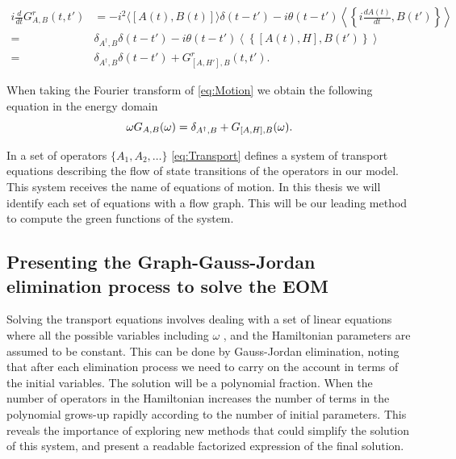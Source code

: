 \begin{align}
i\frac{d}{dt}G_{A,B}^{r}\left(t,t'\right)&=-i^{2}\langle\left[A(t),B(t)\right]\rangle\delta\left(t-t'\right)-i\theta\left(t-t'\right){\displaystyle \left\langle \left\{ i\frac{dA(t)}{dt},B(t')\right\} \right\rangle } \\
=& \delta_{A^{\dagger},B}\delta\left(t-t'\right)-i\theta\left(t-t'\right)\left\langle \left\{ \left[A(t),H\right],B(t')\right\} \right\rangle  \\
= & \delta_{A^{\dagger},B}\delta\left(t-t'\right)+G_{\left[A,H'\right],B}^{r}\left(t,t'\right). \label{eq:Motion}
\end{align}

When taking the Fourier transform of \eqref{eq:Motion} we obtain the following equation in the energy domain  
\begin{equation}
    \omega G_{A,B}(\omega)=\delta_{A^{\dagger},B}+G_{\left[A,H\right],B}(\omega).
    \label{eq:Transport}
\end{equation}


\noindent In a set of operators $\{A_1, A_2, \ldots \}$ \eqref{eq:Transport} defines a system of transport equations describing the flow of state transitions of the operators in our model. This system receives the  name of equations of motion. In this thesis we will identify each set of equations with a flow graph. This will be our leading method to compute the green functions of the system.


\subsection{Presenting the Graph-Gauss-Jordan elimination process to solve the EOM \label{sec:GraphMethod}}


Solving the transport equations involves dealing with a set of linear equations where all the possible variables including  $\omega$ , and the Hamiltonian parameters are assumed to be constant.  This can be done by  Gauss-Jordan elimination, noting that after each elimination process we need to carry on the account in terms of the initial  variables. The solution  will be a polynomial fraction.  When the number of operators in the Hamiltonian increases the number of terms in the polynomial grows-up rapidly according to the number of initial parameters. This reveals the importance of exploring new methods that could simplify the solution of this system, and present a readable factorized expression of the final solution.   \\

